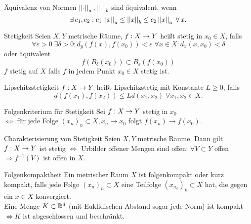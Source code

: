 \documentclass[main.tex]{subfiles}
\begin{document}
\begin{karte}{Äquivalenz von Normen}
    \( \left|\left|\cdot\right|\right|_a, \left|\left|\cdot\right|\right|_b \) sind äquivalent, wenn
    \[ \exists c_1, c_2: c_1\norm{x}_a \leq \norm{x}_b 
    \leq c_2\norm{x}_a \; \forall x. \]
\end{karte}

\begin{karte}{Stetigkeit}
    Seien \(X, Y \) metrische Räume, \(f : X \rightarrow Y\)
    heißt stetig in \(x_0 \in X\), falls 
    \[ \forall \varepsilon > 0 \; \exists \delta > 0:
    d_y(f(x), f(x_0)) < \varepsilon \; \forall x \in X: 
    d_x(x, x_0) < \delta \]
    oder äquivalent 
    \[ f(B_\delta(x_0)) \subset B_\varepsilon(f(x_0)) \]
    \(f\) stetig auf \(X\) falls \(f\) in jedem Punkt 
    \(x_0 \in X\) stetig ist.
\end{karte}

\begin{karte}{Lipschitzstetigkeit}
    \( f : X \rightarrow Y \) heißt Lipschitzstetig 
    mit Konstante \( L \geq 0 \), falls 
    \[ d(f(x_1), f(x_2)) 
    \leq L d(x_1, x_2) \;\forall x_1, x_2 \in X. \]
\end{karte}

\begin{karte}{Folgenkriterium für Stetigkeit}
    Sei \( f : X \rightarrow Y \) stetig in \(x_0\)\\
    \( \Leftrightarrow \) für jede Folge 
    \( (x_n)_n \subset X, x_n \rightarrow x_0 \) 
    folgt \( f(x_n) \rightarrow f(x_0) \).
\end{karte}

\begin{karte}{Charakterisierung von Stetigkeit}
    Seien \( X, Y \) metrische Räume. Dann gilt \( f : X \rightarrow Y \)
    ist stetig \( \Leftrightarrow \) Urbilder offener Mengen sind offen:
    \( \forall V \subset Y \) offen \(\Rightarrow f^{-1}(V) \) ist offen in \( X \).
\end{karte}

\begin{karte}{Folgenkompaktheit}
    Ein metrischer Raum \( X \) ist folgenkompakt oder kurz kompakt, 
    falls jede Folge \((x_n)_n \subset X \) eine Teilfolge
    \( (x_{n_k})_k \subset X \) hat, die gegen ein \( x \in X \) konvergiert. \\
    Eine Menge \( K \subset \mathbb{R}^d \) (mit Euklidischen Abstand sogar jede
    Norm) ist kompakt \( \Leftrightarrow K \) ist abgeschlossen und
    beschränkt.
\end{karte}
\end{document}
